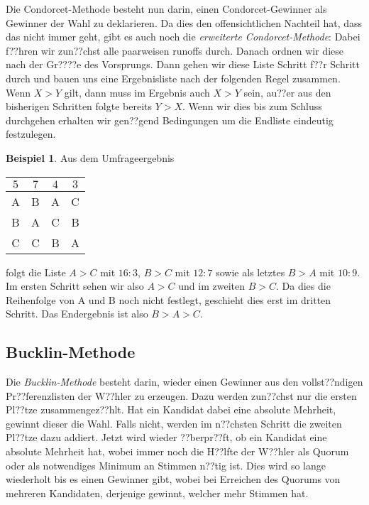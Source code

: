 \documentclass{zirkelblatt1415}
\theoremstyle{definition}
\theoremstyle{definition}
\newtheorem*{beispiel}{Beispiel}
\theoremstyle{definition}
\theoremstyle{definition}
\theoremstyle{remark}
\begin{document}
Die Condorcet-Methode besteht nun darin, einen Condorcet-Gewinner als Gewinner der Wahl zu deklarieren. Da dies den offensichtlichen Nachteil hat, dass das nicht immer geht, gibt es auch noch die \emph{erweiterte Condorcet-Methode}: Dabei f??hren wir zun??chst alle paarweisen runoffs durch. Danach ordnen wir diese nach der Gr????e des Vorsprungs. Dann gehen wir diese Liste Schritt f??r Schritt durch und bauen uns eine Ergebnisliste nach der folgenden Regel zusammen. Wenn $X>Y$ gilt, dann muss im Ergebnis auch $X>Y$ sein, au??er aus den bisherigen Schritten folgte bereits $Y>X$. Wenn wir dies bis zum Schluss durchgehen erhalten wir gen??gend Bedingungen um die Endliste eindeutig festzulegen.

\begin{beispiel}
Aus dem Umfrageergebnis
\begin{center}
    \begin{tabular}{cccc}
    \toprule
     $5$ & $7$ & $4$ & $3$ \\ \midrule
    A & B & A & C \\[5pt]
    B & A & C & B \\[5pt]
    C & C & B & A \\
    \bottomrule
    \end{tabular}
\end{center}
folgt die Liste $A>C$ mit $16:3$, $B>C$ mit $12:7$ sowie als letztes $B>A$ mit $10:9$. Im ersten Schritt sehen wir also $A>C$ und im zweiten $B>C$. Da dies die Reihenfolge von A und B noch nicht festlegt, geschieht dies erst im dritten Schritt. Das Endergebnis ist also $B>A>C$.
\end{beispiel}

\subsection{Bucklin-Methode}

Die \emph{Bucklin-Methode} besteht darin, wieder einen Gewinner aus den vollst??ndigen Pr??ferenzlisten der W??hler zu erzeugen. Dazu werden zun??chst nur die ersten Pl??tze zusammengez??hlt. Hat ein Kandidat dabei eine absolute Mehrheit, gewinnt dieser die Wahl. Falls nicht, werden im n??chsten Schritt die zweiten Pl??tze dazu addiert. Jetzt wird wieder ??berpr??ft, ob ein Kandidat eine absolute Mehrheit hat, wobei immer noch die H??lfte der W??hler als Quorum oder als notwendiges Minimum an Stimmen n??tig ist. Dies wird so lange wiederholt bis es einen Gewinner gibt, wobei bei Erreichen des Quorums von mehreren Kandidaten, derjenige gewinnt, welcher mehr Stimmen hat.
\end{document}
